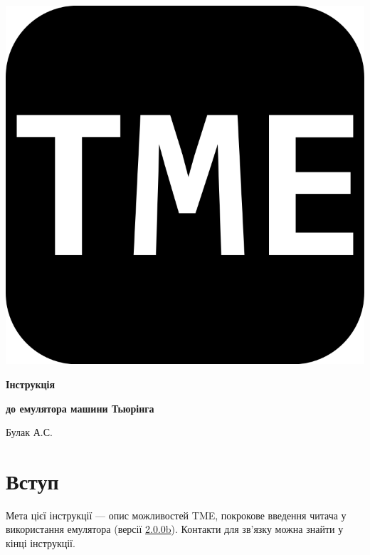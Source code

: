 \documentclass[oneside,final,14pt]{extreport}
\begin{document}
\begin{centering}

\thispagestyle{empty} %
\begin{minipage}[t]{16.75cm}

\begin{center}
\includegraphics[scale=0.13]{tme}
\end{center}

\vspace{9cm}

\centerline{\Huge  \bfseries Інструкція}
\centerline{\Large \bfseries до емулятора машини Тьюрінга}

\vspace{11,4cm}

\centerline{Булак А.С.}
\vspace{0,2cm}


\end{minipage}

\end{centering}


\pagebreak
	
\tableofcontents
\pagebreak
\setcounter{page}{2}
	
\chapter*{Вступ}
Мета цієї інструкції --- опис можливостей TME, покрокове введення читача у використання емулятора (версії \href{https://github.com/Kaifolog/TME/releases/tag/v2.0.0b}{2.0.0b}). Контакти для зв'язку можна знайти у кінці інструкції.
\end{document}
